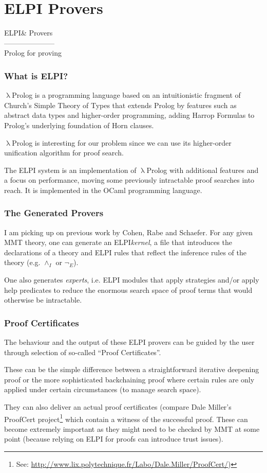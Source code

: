 \documentclass[aspectratio=169, usenames, dvipsnames]{beamer}
\newcommand{\MMT}{\textsf{MMT}\xspace}
\newcommand{\LPL}{$\uplambda$Prolog\xspace}
\newcommand{\ELPI}{\textsf{ELPI}\xspace}
\begin{document}
\section{ELPI Provers}

\begin{frame}
\Huge
\begin{center}
\ELPI \& Provers\large\\
---------------------\\
Prolog for proving
\end{center}
\end{frame}

\begin{frame}
\frametitle{What is ELPI?}
\LPL is a programming language based on an intuitionistic fragment of Church's Simple Theory of Types that extends Prolog by features such as abstract data types and higher-order programming, adding Harrop Formulas to Prolog's underlying foundation of Horn clauses.
\medskip

\LPL is interesting for our problem since we can use its higher-order unification algorithm for proof search.
\pause\bigskip

The \ELPI system is an implementation of \LPL with additional features and a focus on performance, moving some previously intractable proof searches into reach. It is implemented in the OCaml programming language.

\end{frame}

\begin{frame}
\frametitle{The Generated Provers}
I am picking up on previous work by Cohen, Rabe and Schaefer. For any given \MMT theory, one can generate an \ELPI \emph{kernel}, a file that introduces the declarations of a theory and \ELPI rules that reflect the inference rules of the theory (e.g. $\wedge_I$ or $\neg_E$).
\pause\bigskip

One also generates \emph{experts}, i.e. \ELPI modules that apply strategies and/or apply help predicates to reduce the enormous search space of proof terms that would otherwise be intractable.
\end{frame}

\begin{frame}
\frametitle{Proof Certificates}
The behaviour and the output of these \ELPI provers can be guided by the user through selection of so-called ``Proof Certificates''.
\bigskip

These can be the simple difference between a straightforward iterative deepening proof or the more sophisticated backchaining proof where certain rules are only applied under certain circumstances (to manage search space).
\pause\bigskip

They can also deliver an actual proof certificates (compare Dale Miller's \textsf{ProofCert} project\footnote{See: \url{http://www.lix.polytechnique.fr/Labo/Dale.Miller/ProofCert/})} which contain a witness of the successful proof. These can become extremely important as they might need to be checked by \MMT at some point (because relying on \ELPI for proofs can introduce trust issues).
\end{frame}
\end{document}
